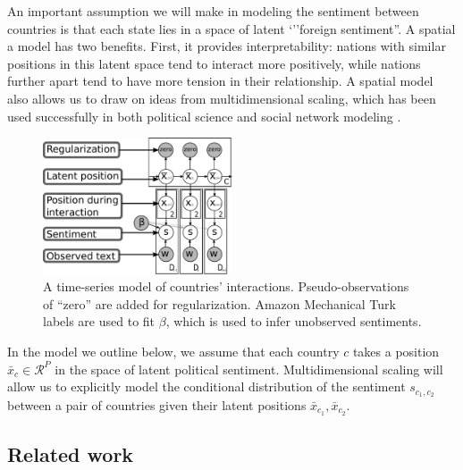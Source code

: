 \label{section:foreign_relations_supervised_model}

An important assumption we will make in modeling the sentiment between
countries is that each state lies in a space of latent `''foreign
sentiment''.  A spatial a model has two benefits. First, it provides
interpretability: nations with similar positions in this latent space
tend to interact more positively, while nations further apart tend to
have more tension in their relationship.  A spatial model also allows
us to draw on ideas from multidimensional scaling, which has been used
successfully in both political science \cite{martin:2002,jackman:2001}
and social network modeling \cite{hoff:2002,chang:2009}.

\begin{figure}
  \center
  \vspace{-55pt}
  \includegraphics[width=0.5\textwidth]{chapter_foreign_relations/figures/countries_gm.pdf}
  \caption{A time-series model of countries' interactions.
    Pseudo-observations of ``zero'' are added for regularization.
    Amazon Mechanical Turk labels are used to fit $\beta$, which is
    used to infer unobserved sentiments.}
  \label{figure:gm}
\end{figure}

In the model we outline below, we assume that each country $c$ takes a
position $\bar x_c \in \mathcal{R}^P$ in the space of latent political
sentiment.  Multidimensional scaling will allow us to explicitly model
the conditional distribution of the sentiment $s_{c_1, c_2}$ between a
pair of countries given their latent positions $\bar x_{c_1}, \bar
x_{c_2}$.

\subsection{Related work}

